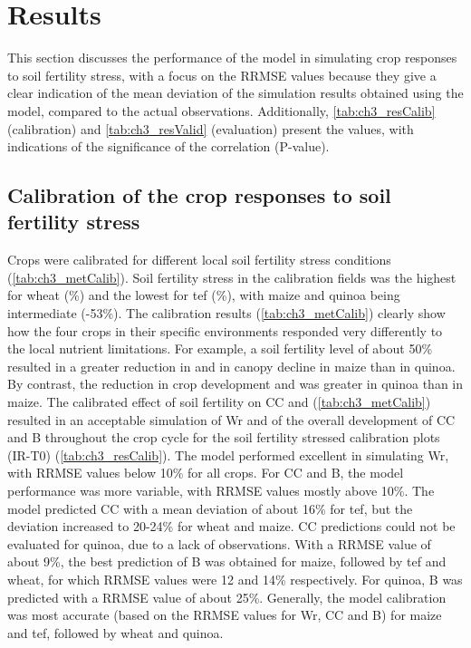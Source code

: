 \section{Results}
This section discusses the performance of the model in simulating crop responses to soil fertility stress, with a focus on the RRMSE values because they give a clear indication of the mean deviation of the simulation results obtained using the model, compared to the actual observations. Additionally, \autoref{tab:ch3_resCalib} (calibration) and \autoref{tab:ch3_resValid} (evaluation) present the \Rsq  values, with indications of the significance of the correlation (P-value).

\subsection{Calibration of the crop responses to soil fertility stress}
Crops were calibrated for different local soil fertility stress conditions (\autoref{tab:ch3_metCalib}). Soil fertility stress in the calibration fields was the highest for wheat (\%) and the lowest for tef (\%), with maize and quinoa being intermediate (-53\%). The calibration results (\autoref{tab:ch3_metCalib}) clearly show how the four crops in their specific environments responded very differently to the local nutrient limitations. For example, a soil fertility level \Brel of about 50\% resulted in a greater reduction in \WPster and in canopy decline in maize than in quinoa. By contrast, the reduction in crop development and \CCx was greater in quinoa than in maize. The calibrated effect of soil fertility on CC and \WPster (\autoref{tab:ch3_metCalib}) resulted in an acceptable simulation of Wr and of the overall development of CC and B throughout the crop cycle for the soil fertility stressed calibration plots (IR-T0) (\autoref{tab:ch3_resCalib}). The model performed excellent in simulating Wr, with RRMSE values below 10\% for all crops. For CC and B, the model performance was more variable, with RRMSE values mostly above 10\%. The model predicted CC with a mean deviation of about 16\% for tef, but the deviation increased to 20-24\% for wheat and maize. CC predictions could not be evaluated for quinoa, due to a lack of observations. With a RRMSE value of about 9\%, the best prediction of B was obtained for maize, followed by tef and wheat, for which RRMSE values were 12 and 14\% respectively. For quinoa, B was predicted with a RRMSE value of about 25\%. Generally, the model calibration was most accurate (based on the RRMSE values for Wr, CC and B) for maize and tef, followed by wheat and quinoa.

